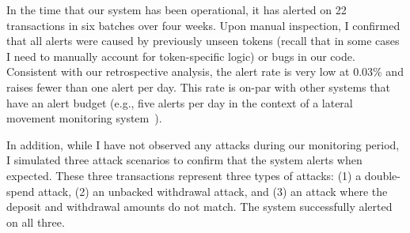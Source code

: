 In the time that our system has been operational, it has alerted on 22 transactions in six batches over four weeks. Upon manual inspection, I confirmed that all alerts were caused by previously unseen tokens (recall that in some cases I need to manually account for token-specific logic) or bugs in our code. Consistent with our retrospective analysis, the alert rate is very low at 0.03\% and raises fewer than one alert per day. This rate is on-par with other systems that have an alert budget (e.g., five alerts per day in the context of a lateral movement monitoring system~\cite{ho2021hopper}).

In addition, while I have not observed any attacks during our
monitoring period, I simulated three attack scenarios to confirm that
the system alerts when expected.  These three transactions represent
three types of attacks: (1) a double-spend attack, (2) an
unbacked withdrawal attack, and (3) an attack where the deposit and
withdrawal amounts do not match. The system successfully alerted on
all three. %

